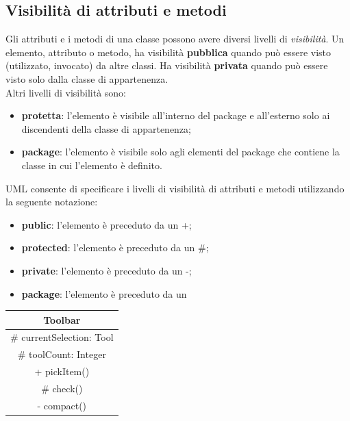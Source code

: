 \documentclass[12pt]{report}
\begin{document}
\subsection{Visibilità di attributi e metodi} Gli attributi e i metodi di una classe possono avere diversi livelli di \textit{visibilità}. Un elemento, attributo o metodo, ha visibilità \textbf{pubblica} quando può essere visto (utilizzato, invocato) da altre classi. Ha visibilità \textbf{privata} quando può essere visto solo dalla classe di appartenenza. \\
Altri livelli di visibilità sono:
\begin{itemize}
	\item \textbf{protetta}: l'elemento è visibile all'interno del package e all'esterno solo ai discendenti della classe di appartenenza;
	\item \textbf{package}: l'elemento è visibile solo agli elementi del package che contiene la classe in cui l'elemento è definito.
\end{itemize}
UML consente di specificare i livelli di visibilità di attributi e metodi utilizzando la seguente notazione:
\begin{itemize}
	\item \textbf{public}: l'elemento è preceduto da un +;
	\item \textbf{protected}: l'elemento è preceduto da un $\#$;
	\item \textbf{private}: l'elemento è preceduto da un -;
	\item \textbf{package}: l'elemento è preceduto da un ~
\end{itemize}
\begin{center}
	\begin{tabular}{|c|}
		\hline
		Toolbar \\
		\hline
		\# currentSelection: Tool \\
		\# toolCount: Integer \\
		\hline
		+ pickItem() \\
		\# check() \\
		- compact() \\
		\hline
	\end{tabular}
\end{center}
\end{document}
